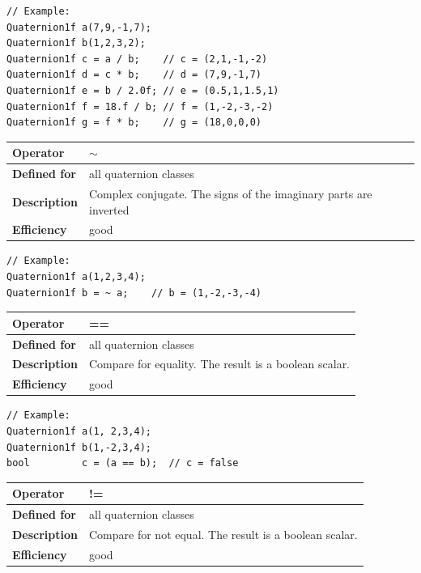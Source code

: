 \documentclass[11pt,a4paper,oneside,openright]{report}
\newcommand{\vspacesmall}{\vspace{3mm}}
\newcommand{\vspacebig}{\vspace{6mm}}
\begin{document}
\begin{lstlisting}[frame=none]
// Example:
Quaternion1f a(7,9,-1,7);
Quaternion1f b(1,2,3,2);
Quaternion1f c = a / b;    // c = (2,1,-1,-2)
Quaternion1f d = c * b;    // d = (7,9,-1,7)
Quaternion1f e = b / 2.0f; // e = (0.5,1,1.5,1)
Quaternion1f f = 18.f / b; // f = (1,-2,-3,-2)
Quaternion1f g = f * b;    // g = (18,0,0,0)
\end{lstlisting}
\vspacebig


\begin{tabular}{|p{25mm}|p{100mm}|}
\hline
\bfseries Operator & $\sim$ \\ \hline
\bfseries Defined for & all quaternion classes  \\ \hline
\bfseries Description & Complex conjugate. The signs of the imaginary parts are inverted \\ \hline
\bfseries Efficiency & good \\ \hline
\end{tabular}
\vspacesmall

\begin{lstlisting}[frame=none]
// Example:
Quaternion1f a(1,2,3,4);
Quaternion1f b = ~ a;    // b = (1,-2,-3,-4)
\end{lstlisting}
\vspacebig


\begin{tabular}{|p{25mm}|p{100mm}|}
\hline
\bfseries Operator & == \\ \hline
\bfseries Defined for & all quaternion classes  \\ \hline
\bfseries Description & Compare for equality.\newline
The result is a boolean scalar. \\ \hline
\bfseries Efficiency & good \\ \hline
\end{tabular}
\vspacesmall

\begin{lstlisting}[frame=none]
// Example:
Quaternion1f a(1, 2,3,4);
Quaternion1f b(1,-2,3,4);
bool         c = (a == b);  // c = false
\end{lstlisting}
\vspacebig


\begin{tabular}{|p{25mm}|p{100mm}|}
\hline
\bfseries Operator & != \\ \hline
\bfseries Defined for & all quaternion classes  \\ \hline
\bfseries Description & Compare for not equal.\newline
The result is a boolean scalar. \\ \hline
\bfseries Efficiency & good \\ \hline
\end{tabular}
\vspacesmall
\end{document}
